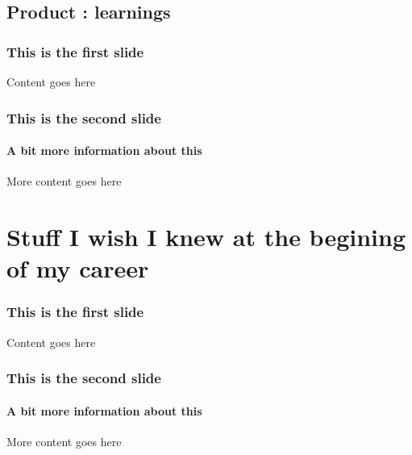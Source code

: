\documentclass{beamer}
\begin{document}
\subsection{Product : learnings}
\begin{frame}
  \frametitle{This is the first slide}
  Content goes here
\end{frame}
\begin{frame}
  \frametitle{This is the second slide}
  \framesubtitle{A bit more information about this}
  More content goes here
\end{frame}

\section{Stuff I wish I knew at the begining of my career}
\begin{frame}
  \frametitle{This is the first slide}
  Content goes here
\end{frame}
\begin{frame}
  \frametitle{This is the second slide}
  \framesubtitle{A bit more information about this}
  More content goes here
\end{frame}
\end{document}
